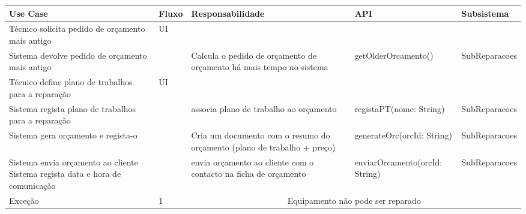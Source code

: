 \documentclass[../relatorio.tex]{subfiles}
\begin{document}
\begin{landscape}
    \begin{table}[!h]
        \centering
        \begin{tabular}{|p{5cm}|p{1cm}|p{4cm}|p{6cm}|p{3cm}|}
            \hline
            \rowcolor{gray!20!white}
            Use Case & Fluxo & Responsabilidade & API & Subsistema \\
            \hline
            \rowcolor{yellow}
            Técnico solicita pedido de orçamento mais antigo
                     & 
            UI
                     & 
                     & 
                     & 
            \\
            \hline
            Sistema devolve pedido de orçamento mais antigo
                     & 
                     & 
            Calcula o pedido de orçamento de orçamento há mais tempo no sistema
                     & 
            getOlderOrcamento()
                     & 
            SubReparacoes
            \\
            \hline
            \rowcolor{yellow}
            Técnico define plano de trabalhos para a reparação
                     & 
            UI 
                     & 
                     & 
                     & 
            \\
            \hline
            Sistema regista plano de trabalhos para a reparação
                     & 
                     & 
            associa plano de trabalho ao orçamento
                     & 
            registaPT(nome: String)
                     & 
            SubReparacoes
            \\
            \hline
            Sistema gera orçamento e regista-o
                     & 
                     & 
            Cria um documento com o resumo do orçamento (plano de trabalho + preço)
                     & 
            generateOrc(orcId: String)
                     & 
            SubReparacoes
            \\
            \hline
            Sistema envia orçamento ao cliente
            Sistema regista data e hora de comunicação
                     & 
                     & 
            envia orçamento ao cliente com o contacto na ficha de orçamento
                     & 
            enviarOrcamento(orcId: String)
                     & 
            SubReparacoes
            \\
            \hline
            \rowcolor{red!30}
            Exceção
                     & 
            1 
                     & 
            \multicolumn{3}{c}{Equipamento não pode ser reparado}

\end{tabular}
\end{table}
\end{landscape}
\end{document}
